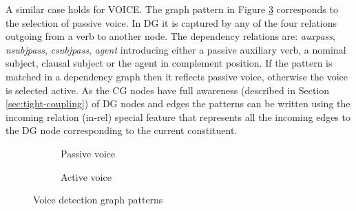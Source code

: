     A similar case holds for VOICE. The graph pattern in Figure \ref{fig:voice-pattern7} corresponds to the selection of passive voice. In DG it is captured by any of the four relations outgoing from a verb to another node. The dependency relations are: \textit{auxpass}, \textit{nsubjpass}, \textit{csubjpass}, \textit{agent} introducing either a passive auxiliary verb, a nominal subject, clausal subject or the agent in complement position. If the pattern is matched in a dependency graph then it reflects passive voice, otherwise the voice is selected active. As the CG nodes have full awareness (described in Section \ref{sec:tight-coupling}) of DG nodes and edges the patterns can be written using the incoming relation (in-rel) special feature that represents all the incoming edges to the DG node corresponding to the current constituent. 

    \begin{figure}[!ht]
        \centering
        \begin{subfigure}[t]{0.47\textwidth}
            \centering
            \caption{Passive voice}
            \label{fig:voice-pattern5}
        \end{subfigure}
        \begin{subfigure}[t]{0.47\textwidth}
            \centering
            \caption{Active voice}
            \label{fig:voice-pattern6}
        \end{subfigure}
        \caption{Voice detection graph patterns}
        \label{fig:voice-pattern7}
    \end{figure}

